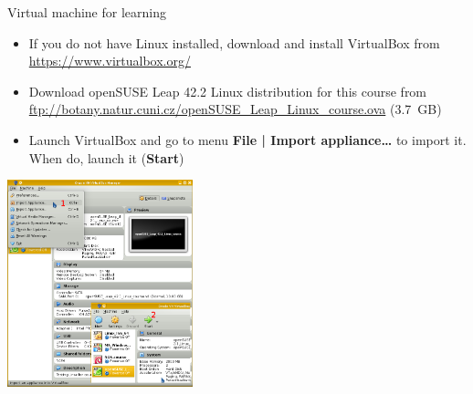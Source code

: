 \documentclass[compress, ucs, xelatex, 11pt, xcolor=svgnames,
  hyperref={
    bookmarks=true,
    unicode=true,
    colorlinks=true,
    pdftitle={Linux, command line and MetaCentrum},
    plainpages=false,
    pdfauthor={Vojtech Zeisek},
    pdfsubject={Course about use of Linux command line, writing shell scripts and using MetaCentrum of CESNET},
    pdfcreator={XeLaTeX},
    pdfkeywords={Linux, GNU, BASH, shell, command line, MetaCentrum},
    linkcolor=DarkRed,
    anchorcolor=DarkBlue,
    citecolor=Indigo,
    filecolor=NavyBlue,
    menucolor=DarkMagenta,
    urlcolor=DarkBlue,
    pdftex},
  url={hyphens, lowtilde} %
  ]{beamer}
\begin{document}
\begin{frame}{Virtual machine for learning}
  \begin{multicols}{2}
    \begin{itemize}
      \item If you do not have Linux installed, download and install VirtualBox from \url{https://www.virtualbox.org/}
      \item Download openSUSE Leap 42.2 Linux distribution for this course from \url{ftp://botany.natur.cuni.cz/openSUSE_Leap_Linux_course.ova} (3.7~GB)
      \item Launch VirtualBox and go to menu \textbf{File | Import appliance\ldots} to import it. When do, launch it (\textbf{Start})
    \end{itemize}
    \includegraphics[height=6cm]{virtualbox.png}
  \end{multicols}
\end{frame}
\end{document}
